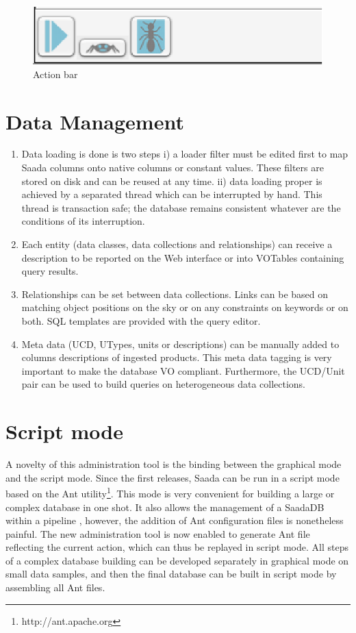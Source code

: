 \begin{figure}[!h]
	\begin{center}
		\includegraphics[height=0.10\textwidth]{part8/MICHEL_P18/P18_fig3.eps}
	\end{center}
	\caption{Action bar}
	\label{fig:fig3 (fig. 4)}
\end{figure}

\section{Data Management}
\begin{enumerate}
\item Data loading is done is two steps i) a loader filter must be edited first to map Saada columns onto native columns or constant values. These filters are stored on disk and can be reused at any time. ii) data loading proper is achieved by a separated thread which can be interrupted by hand. This thread is transaction safe; the database remains consistent whatever are the conditions of its interruption.
\item Each entity (data classes, data collections and relationships) can receive a description to be reported on the Web interface or into VOTables containing query results.
\item Relationships can be set between data collections. Links can be based on matching object positions on the sky or on any constraints on keywords or on both. SQL templates are provided with the query editor.
\item Meta data (UCD, UTypes, units or descriptions) can be manually added to columns descriptions of ingested products. This meta data tagging is very important to make the database VO compliant. Furthermore, the UCD/Unit pair can be used to build queries on heterogeneous data collections.
\end{enumerate}

\section{Script mode}
A novelty of this administration tool is the binding between the graphical mode and the script mode.
Since the first releases, Saada can be run in a script mode based on the Ant utility\footnote{http://ant.apache.org}. This mode is very convenient for building a large or complex database in one shot. It also allows the management of a SaadaDB within a pipeline \citep{P03_adassxxii}, however, the addition of Ant configuration files is nonetheless painful. The new administration tool is now enabled to generate Ant file reflecting the current action, which can thus be replayed in script mode. All steps of a complex database building can be developed separately in graphical mode on small data samples, and then the final database can be built in script mode by assembling all Ant files.

